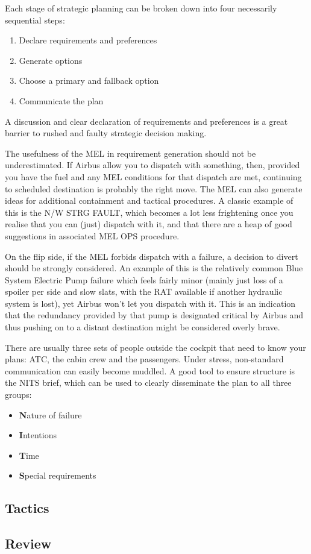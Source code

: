 \documentclass[a5paper,11pt,titlepage]{article}
\begin{document}
Each stage of strategic planning can be broken down into four
necessarily sequential steps:

\begin{enumerate}
\item Declare requirements and preferences
\item Generate options
\item Choose a primary and fallback option
\item Communicate the plan
\end{enumerate}

A discussion and clear declaration of requirements and preferences is a
great barrier to rushed and faulty strategic decision making.

The usefulness of the MEL in requirement generation should not be
underestimated. If Airbus allow you to dispatch with something, then,
provided you have the fuel and any MEL conditions for that dispatch are
met, continuing to scheduled destination is probably the right move. The
MEL can also generate ideas for additional containment and tactical
procedures. A classic example of this is the N/W STRG FAULT, which
becomes a lot less frightening once you realise that you can (just)
dispatch with it, and that there are a heap of good suggestions in
associated MEL OPS procedure.

On the flip side, if the MEL forbids dispatch with a failure, a decision
to divert should be strongly considered. An example of this is the
relatively common Blue System Electric Pump failure which feels fairly
minor (mainly just loss of a spoiler per side and slow slats, with the
RAT available if another hydraulic system is lost), yet Airbus won't let
you dispatch with it. This is an indication that the redundancy provided
by that pump is designated critical by Airbus and thus pushing on to
a distant destination might be considered overly brave.

There are usually three sets of people outside the cockpit that need to
know your plans: ATC, the cabin crew and the passengers. Under stress,
non-standard communication can easily become muddled. A good tool to
ensure structure is the NITS brief, which can be used to clearly
disseminate the plan to all three groups:

\begin{itemize}
\item \textbf{N}ature of failure
\item \textbf{I}ntentions
\item \textbf{T}ime
\item \textbf{S}pecial requirements
\end{itemize}

\subsection{Tactics}
\subsection{Review}
\end{document}
